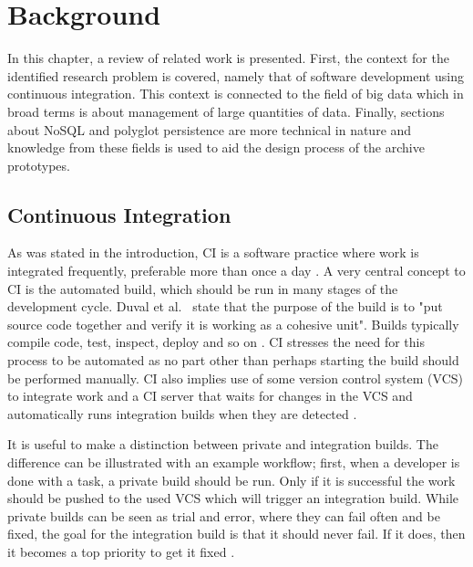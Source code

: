 \chapter{Background}
\label{chap:background}

In this chapter, a review of related work is presented. First, the context for the identified research problem is covered, namely that of software development using continuous integration. This context is connected to the field of big data which in broad terms is about management of large quantities of data. Finally, sections about NoSQL and polyglot persistence are more technical in nature and knowledge from these fields is used to aid the design process of the archive prototypes.


\section{Continuous Integration}
As was stated in the introduction, CI is a software practice where work is integrated frequently, preferable more than once a day \cite{FowlerCI}. A very central concept to CI is the automated build, which should be run in many stages of the development cycle. Duval et al.\ \cite{CIbook} state that the purpose of the build is to "put source code together and verify it is working as a cohesive unit". Builds typically compile code, test, inspect, deploy and so on \cite{CIbook}. CI stresses the need for this process to be automated as no part other than perhaps starting the build should be performed manually. CI also implies use of some version control system (VCS) to integrate work and a CI server that waits for changes in the VCS and automatically runs integration builds when they are detected \cite{FowlerCI}.

It is useful to make a distinction between private and integration builds. The difference can be illustrated with an example workflow;
first, when a developer is done with a task, a private build should be run. Only if it is successful the work should be pushed to the used VCS which will trigger an integration build. While private builds can be seen as trial and error, where they can fail often and be fixed, the goal for the integration build is that it should never fail. If it does, then it becomes a top priority to get it fixed \cite{FowlerCI}.

